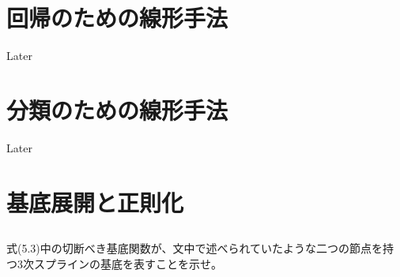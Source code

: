 \documentclass{jsarticle}
\begin{document}
\section{回帰のための線形手法}
Later

\section{分類のための線形手法}
Later

\section{基底展開と正則化}

\subsection{}

\begin{shadebox}
式(5.3)中の切断べき基底関数が、文中で述べられていたような二つの節点を持つ3次スプラインの基底を表すことを示せ。
\end{shadebox}
\end{document}

